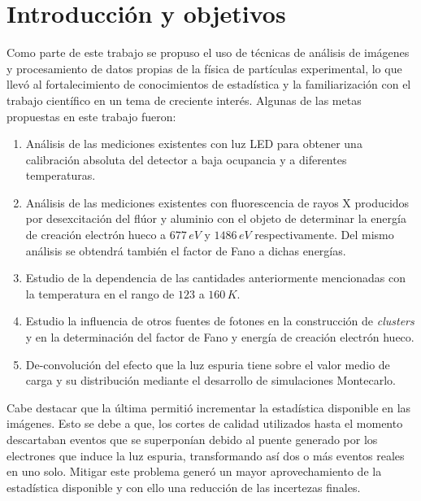 \chapter{Introducción y objetivos}
\noindent Como parte de este trabajo se propuso el uso de técnicas de análisis de imágenes y procesamiento de datos propias de la física de partículas experimental, lo que llevó al fortalecimiento de conocimientos de estadística y la familiarización con el trabajo científico en un tema de creciente interés. 
Algunas de las metas propuestas en este trabajo fueron:
\begin{enumerate}
    \item Análisis de las mediciones existentes con luz LED para obtener una calibración absoluta del detector a baja ocupancia y a diferentes temperaturas.
    \item Análisis de las mediciones existentes con fluorescencia de rayos X producidos por desexcitación del flúor y aluminio con el objeto de determinar la energía de creación electrón hueco a $677\,\si{eV}$ y $1486\,\si{eV}$ respectivamente. Del mismo análisis se obtendrá también el factor de Fano a dichas energías.
    \item Estudio de la dependencia de las cantidades anteriormente mencionadas con la temperatura en el rango de $123$ a $160\,K$.
    \item Estudio la influencia de otros fuentes de fotones en la construcción de \textit{clusters} y en la determinación del factor de Fano y energía de creación electrón hueco.
    \item De-convolución del efecto que la luz espuria tiene sobre el valor medio de carga y su distribución mediante el desarrollo de simulaciones Montecarlo.
\end{enumerate}
Cabe destacar que la última permitió incrementar la estadística disponible en las imágenes. Esto se debe a que, los cortes de calidad utilizados hasta el momento descartaban eventos que se superponían debido al puente generado por los electrones que induce la luz espuria, transformando así dos o más eventos reales en uno solo. Mitigar este problema generó un mayor aprovechamiento de la estadística disponible y con ello una reducción de las incertezas finales.
